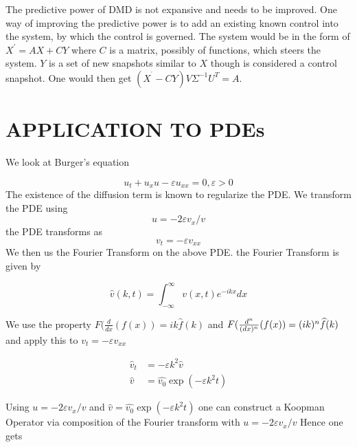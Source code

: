 \documentclass[12pt]{report}
\begin{document}
The predictive power of DMD is not expansive and needs to be improved. One
way of improving the predictive power is to add an existing known control
into the system, by which the control is governed. The system would be
in the form of $X^{\prime }=AX+CY$ where $C$ is a matrix, possibly of
functions, which steers the system. $Y$ is a set of new snapshots
similar to $X$ though is considered a control snapshot. One would then get 
$(X^{^{\prime }}-CY)V\Sigma ^{-1}U^{T}=A.$

\section{APPLICATION TO PDEs}

We look at Burger's equation

\begin{equation}
u_{t}+u_{x}u-\varepsilon u_{xx}=0,\varepsilon >0
\end{equation}
The existence of the diffusion term is known to regularize the PDE.
We transform the PDE using
\begin{equation}
u=-2\varepsilon v_{x}/v
\end{equation}
the PDE transforms as
\begin{equation}
v_{t}=-\varepsilon v_{xx}
\end{equation}
We then us the Fourier Transform on the above PDE.
the Fourier Transform is given by

\begin{equation}
\widehat{v}(k,t)=\int_{-\infty }^{\infty }v(x,t)e^{-ikx}dx
\end{equation}

We use the property $F(\frac{d}{dx}(f(x))=ik\widehat{f}(k)$ and $F(\frac{%
d^{n}}{(dx)^{n}}(f(x))=(ik)^{n}\widehat{f}(k)$ and apply this to $%
v_{t}=-\varepsilon v_{xx}$

\begin{equation}
    \begin{aligned}
        \widehat{v}_{t} &=-\varepsilon k^{2}\widehat{v} \\
        \widehat{v} &=\widehat{v_{0}}\exp (-\varepsilon k^{2}t)
    \end{aligned}
\end{equation}

Using $u=-2\varepsilon v_{x}/v$ and $\widehat{v}=\widehat{v_{0}}\exp
(-\varepsilon k^{2}t)$ one can construct a Koopman Operator via composition
of the Fourier transform with $u=-2\varepsilon v_{x}/v$
Hence one gets
\end{document}
